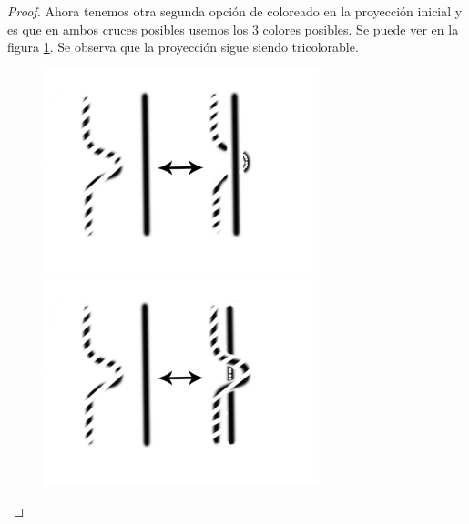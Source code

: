 \documentclass[14pt]{extarticle}
\begin{document}
\begin{teo}
\begin{proof}
	Ahora tenemos otra segunda opción de coloreado en la proyección inicial y es que en ambos cruces posibles usemos los 3 colores posibles. Se puede ver en la figura \ref{demotri3}. Se observa que la proyección sigue siendo tricolorable. \\
	
	\begin{figure}[h!]
		\centering
		\includegraphics[width=8cm]{inudos/movi3tri.png}
		\includegraphics[width=8cm]{inudos/movi4tri.png}
		\caption{}
		\label{demotri3} 
	\end{figure}
	

\end{proof}
\end{teo}
\end{document}
